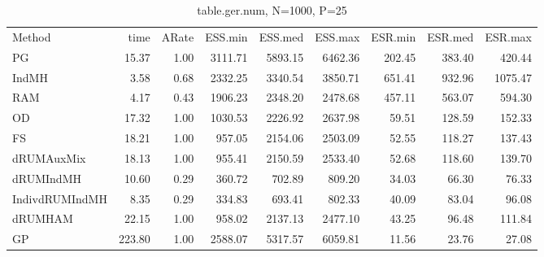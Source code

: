 \begin{table}
\label{tab:blogit-ger.num}
\begin{tabular}{l r r r r r r r r } 
          Method  &     time &    ARate &  ESS.min &  ESS.med &  ESS.max &  ESR.min &  ESR.med &  ESR.max \\ 
              PG  &    15.37 &     1.00 &  3111.71 &  5893.15 &  6462.36 &   202.45 &   383.40 &   420.44 \\ 
           IndMH  &     3.58 &     0.68 &  2332.25 &  3340.54 &  3850.71 &   651.41 &   932.96 &  1075.47 \\ 
             RAM  &     4.17 &     0.43 &  1906.23 &  2348.20 &  2478.68 &   457.11 &   563.07 &   594.30 \\ 
              OD  &    17.32 &     1.00 &  1030.53 &  2226.92 &  2637.98 &    59.51 &   128.59 &   152.33 \\ 
              FS  &    18.21 &     1.00 &   957.05 &  2154.06 &  2503.09 &    52.55 &   118.27 &   137.43 \\ 
      dRUMAuxMix  &    18.13 &     1.00 &   955.41 &  2150.59 &  2533.40 &    52.68 &   118.60 &   139.70 \\ 
       dRUMIndMH  &    10.60 &     0.29 &   360.72 &   702.89 &   809.20 &    34.03 &    66.30 &    76.33 \\ 
  IndivdRUMIndMH  &     8.35 &     0.29 &   334.83 &   693.41 &   802.33 &    40.09 &    83.04 &    96.08 \\ 
         dRUMHAM  &    22.15 &     1.00 &   958.02 &  2137.13 &  2477.10 &    43.25 &    96.48 &   111.84 \\ 
              GP  &   223.80 &     1.00 &  2588.07 &  5317.57 &  6059.81 &    11.56 &    23.76 &    27.08
 \end{tabular}
\caption{table.ger.num, N=1000, P=25}
\end{table}


